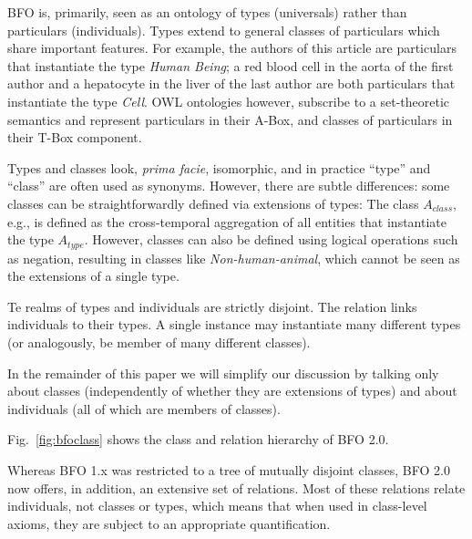 BFO is, primarily, seen as an ontology of types (universals) rather than particulars (individuals). Types extend to general classes of particulars which share important features. For example, the authors of this article are particulars that instantiate the type \emph{Human Being}; a red blood cell in the aorta of the first author and a hepatocyte in the liver of the last author are both particulars that instantiate the type \emph{Cell}. 
OWL ontologies however, subscribe to a set-theoretic semantics and represent particulars in their A-Box, and classes of particulars in their T-Box component. 

Types and classes look, \emph{prima facie}, isomorphic, and in practice ``type'' and ``class'' are often used as synonyms. However, there are subtle differences: 
some classes can be straightforwardly defined via extensions of types: The class $A_{class}$, e.g., is defined as the cross-temporal  aggregation of all entities that instantiate the 
type $A_{type}$. However, classes can also be defined using logical operations such as negation, 
resulting in classes like \emph{Non-human-animal}, which cannot be seen as the extensions of a single type.  

Te realms of types and individuals are strictly disjoint.
The relation  links individuals to their types. A single instance may instantiate many different types (or analogously, be member of many different classes). 

In the remainder of this paper we will simplify our discussion by talking only about classes (independently of whether they are extensions of types) and about individuals (all of which are members of classes).  

Fig.\ \ref{fig:bfoclass} shows the class and relation hierarchy of BFO 2.0.  


 
Whereas BFO 1.x was restricted to a tree of mutually disjoint classes, BFO 2.0 now offers, in addition, an extensive set of relations. 
Most of these relations relate individuals, not classes or types, which means that when used in class-level axioms, they are 
subject to an appropriate quantification. 



